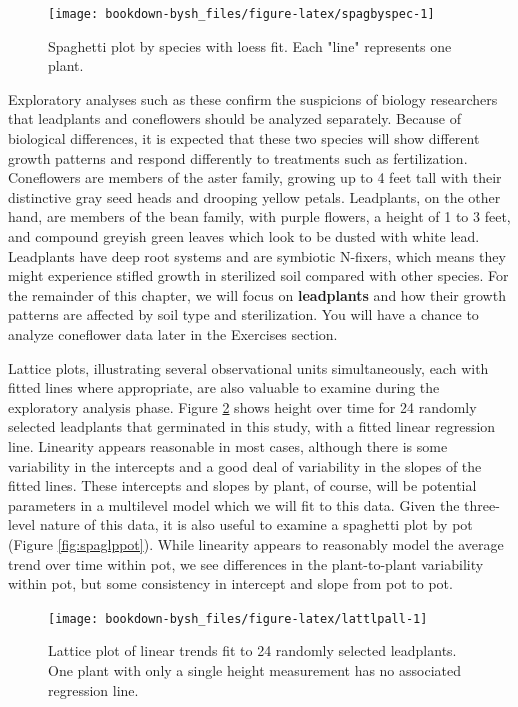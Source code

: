 \documentclass[
]{krantz}
\begin{document}
\begin{figure}

{\centering \texttt{[image: bookdown-bysh\_files/figure-latex/spagbyspec-1]} 

}

\caption{Spaghetti plot by species with loess fit.  Each "line" represents one plant.}\label{fig:spagbyspec}
\end{figure}

Exploratory analyses such as these confirm the suspicions of biology researchers that leadplants and coneflowers should be analyzed separately. Because of biological differences, it is expected that these two species will show different growth patterns and respond differently to treatments such as fertilization. Coneflowers are members of the aster family, growing up to 4 feet tall with their distinctive gray seed heads and drooping yellow petals. Leadplants, on the other hand, are members of the bean family, with purple flowers, a height of 1 to 3 feet, and compound greyish green leaves which look to be dusted with white lead. Leadplants have deep root systems and are symbiotic N-fixers, which means they might experience stifled growth in sterilized soil compared with other species. For the remainder of this chapter, we will focus on \textbf{leadplants} and how their growth patterns are affected by soil type and sterilization. You will have a chance to analyze coneflower data later in the Exercises section.

Lattice plots, illustrating several observational units simultaneously, each with fitted lines where appropriate, are also valuable to examine during the exploratory analysis phase. Figure \ref{fig:lattlpall} shows height over time for 24 randomly selected leadplants that germinated in this study, with a fitted linear regression line. Linearity appears reasonable in most cases, although there is some variability in the intercepts and a good deal of variability in the slopes of the fitted lines. These intercepts and slopes by plant, of course, will be potential parameters in a multilevel model which we will fit to this data. Given the three-level nature of this data, it is also useful to examine a spaghetti plot by pot (Figure \ref{fig:spaglppot}). While linearity appears to reasonably model the average trend over time within pot, we see differences in the plant-to-plant variability within pot, but some consistency in intercept and slope from pot to pot.

\begin{figure}

{\centering \texttt{[image: bookdown-bysh\_files/figure-latex/lattlpall-1]} 

}

\caption{ Lattice plot of linear trends fit to 24 randomly selected leadplants.  One plant with only a single height measurement has no associated regression line.}\label{fig:lattlpall}
\end{figure}
\end{document}
